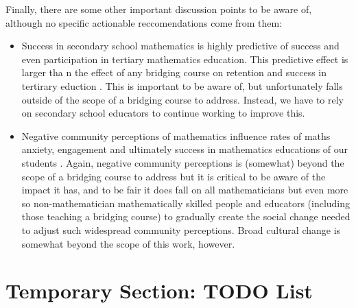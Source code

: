 \documentclass[twoside,12pt,a4paper]{report}
\begin{document}
Finally, there are some other important discussion points to be aware of, although no specific actionable reccomendations come from them:
\begin{itemize}
	\item Success in secondary school mathematics is highly predictive of success and even participation in tertiary mathematics education. This predictive effect is larger tha n the effect of any bridging course on retention and success in tertirary eduction \cite{Kajander2005, Nicholas2015b}. This is important to be aware of, but unfortunately falls outside of the scope of a bridging course to address. Instead, we have to rely on secondary school educators to continue working to improve this.
	\item Negative community perceptions of mathematics influence rates of maths anxiety, engagement and ultimately success in mathematics educations of our students \cite{King2015, Gordon2013, Clark2008}. Again, negative community perceptions is (somewhat) beyond the scope of a bridging course to address but it is critical to be aware of the impact it has, and to be fair it does fall on all mathematicians but even more so non-mathematician mathematically skilled people and educators (including those teaching a bridging course) to gradually create the social change needed to adjust such widespread community perceptions. Broad cultural change is somewhat beyond the scope of this work, however.
\end{itemize}








\newpage

\section{Temporary Section: TODO List}
\end{document}

